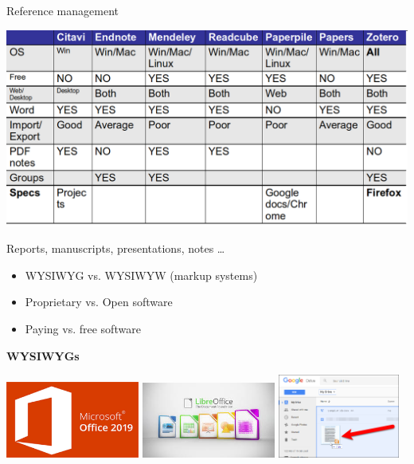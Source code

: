 \documentclass[10pt]{beamer}%
\begin{document}
\begin{frame}{Reference management}

\includegraphics[width=\textwidth]{Figures/comp}

\end{frame}
\begin{frame}{Reports, manuscripts, presentations, notes \dots}
    \begin{itemize}
     \item WYSIWYG vs. WYSIWYW (markup systems)
     \item Proprietary vs. Open software
     \item Paying vs. free software
    \end{itemize}

    \pause
    \textbf{\Large WYSIWYGs}

    \includegraphics[width=0.33\textwidth]{Figures/microsoft}
    \includegraphics[width=0.33\textwidth]{Figures/libreoff}
    \includegraphics[width=0.3\textwidth]{Figures/googledrive}
    
\end{frame}
\end{document}
